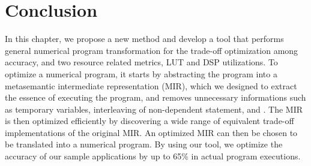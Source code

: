 \section{Conclusion}
\label{po:sec:conclusion}

In this chapter, we propose a new method and develop a tool that performs general
numerical program transformation for the trade-off optimization among accuracy,
and two resource related metrics, LUT and DSP utilizations.  To optimize a
numerical program, it starts by abstracting the program into a metasemantic
intermediate representation (MIR), which we designed to extract the essence of
executing the program, and removes unnecessary informations such as temporary
variables, interleaving of non-dependent statement, and \etc.  The MIR is then
optimized efficiently by discovering a wide range of equivalent trade-off
implementations of the original MIR\@.  An optimized MIR can then be chosen to
be translated into a numerical program.  By using our tool, we optimize the
accuracy of our sample applications by up to 65\% in actual program executions.


